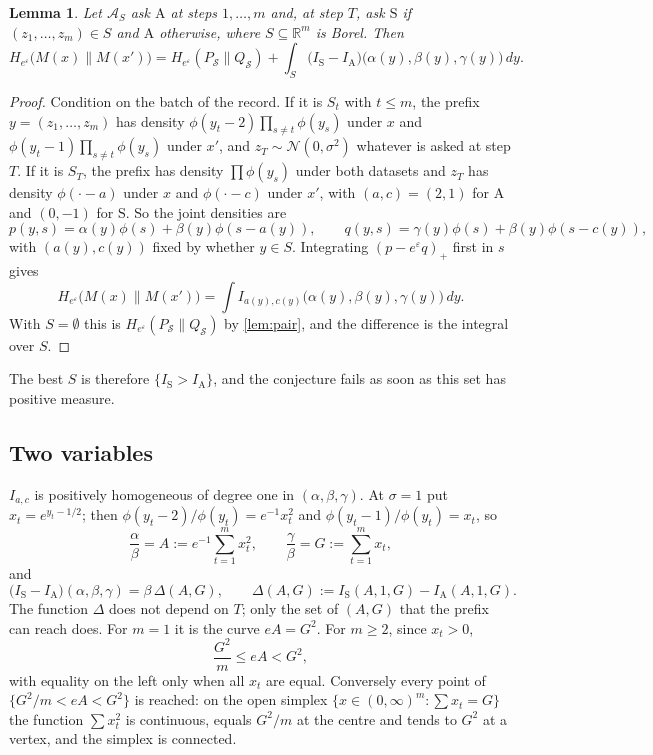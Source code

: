 \documentclass[11pt]{amsart}
\newtheorem{lemma}[theorem]{Lemma}
\theoremstyle{definition}
\theoremstyle{remark}
\newcommand{\R}{\mathbb R}
\newcommand{\N}{\mathcal N}
\newcommand{\ANTI}{\mathrm{A}}
\newcommand{\SAME}{\mathrm{S}}
\newcommand{\He}{H_{e^{\varepsilon}}}
\begin{document}
\begin{lemma}\label{lem:switch}
Let $\mathcal A_S$ ask $\ANTI$ at steps $1,\dots,m$ and, at step $T$, ask $\SAME$ if $(z_1,\dots,z_m)\in S$ and $\ANTI$ otherwise, where $S\subseteq\R^m$ is Borel. Then
\[
\He\bigl(M(x)\|M(x')\bigr)=\He(P_{\mathcal S}\|Q_{\mathcal S})+\int_S\bigl(I_{\SAME}-I_{\ANTI}\bigr)\bigl(\alpha(y),\beta(y),\gamma(y)\bigr)\,dy .
\]
\end{lemma}

\begin{proof}
Condition on the batch of the record. If it is $S_t$ with $t\le m$, the prefix $y=(z_1,\dots,z_m)$ has density $\phi(y_t-2)\prod_{s\ne t}\phi(y_s)$ under $x$ and $\phi(y_t-1)\prod_{s\ne t}\phi(y_s)$ under $x'$, and $z_T\sim\N(0,\sigma^2)$ whatever is asked at step $T$. If it is $S_T$, the prefix has density $\prod\phi(y_s)$ under both datasets and $z_T$ has density $\phi(\cdot-a)$ under $x$ and $\phi(\cdot-c)$ under $x'$, with $(a,c)=(2,1)$ for $\ANTI$ and $(0,-1)$ for $\SAME$. So the joint densities are
\[
p(y,s)=\alpha(y)\phi(s)+\beta(y)\phi(s-a(y)),\qquad q(y,s)=\gamma(y)\phi(s)+\beta(y)\phi(s-c(y)),
\]
with $(a(y),c(y))$ fixed by whether $y\in S$. Integrating $(p-e^\varepsilon q)_+$ first in $s$ gives
\[
\He\bigl(M(x)\|M(x')\bigr)=\int I_{a(y),c(y)}\bigl(\alpha(y),\beta(y),\gamma(y)\bigr)\,dy .
\]
With $S=\emptyset$ this is $\He(P_{\mathcal S}\|Q_{\mathcal S})$ by \cref{lem:pair}, and the difference is the integral over $S$.
\end{proof}

The best $S$ is therefore $\{I_{\SAME}>I_{\ANTI}\}$, and the conjecture fails as soon as this set has positive measure.

\subsection{Two variables}
$I_{a,c}$ is positively homogeneous of degree one in $(\alpha,\beta,\gamma)$. At $\sigma=1$ put $x_t=e^{y_t-1/2}$; then $\phi(y_t-2)/\phi(y_t)=e^{-1}x_t^2$ and $\phi(y_t-1)/\phi(y_t)=x_t$, so
\begin{equation}\label{eq:AG}
\frac{\alpha}{\beta}=A:=e^{-1}\sum_{t=1}^m x_t^2,\qquad \frac{\gamma}{\beta}=G:=\sum_{t=1}^m x_t,
\end{equation}
and
\begin{equation}\label{eq:Delta}
\bigl(I_{\SAME}-I_{\ANTI}\bigr)(\alpha,\beta,\gamma)=\beta\,\Delta(A,G),\qquad \Delta(A,G):=I_{\SAME}(A,1,G)-I_{\ANTI}(A,1,G).
\end{equation}
The function $\Delta$ does not depend on $T$; only the set of $(A,G)$ that the prefix can reach does. For $m=1$ it is the curve $eA=G^2$. For $m\ge2$, since $x_t>0$,
\begin{equation}\label{eq:region}
\frac{G^2}{m}\le eA<G^2,
\end{equation}
with equality on the left only when all $x_t$ are equal. Conversely every point of $\{G^2/m<eA<G^2\}$ is reached: on the open simplex $\{x\in(0,\infty)^m:\sum x_t=G\}$ the function $\sum x_t^2$ is continuous, equals $G^2/m$ at the centre and tends to $G^2$ at a vertex, and the simplex is connected.
\end{document}

